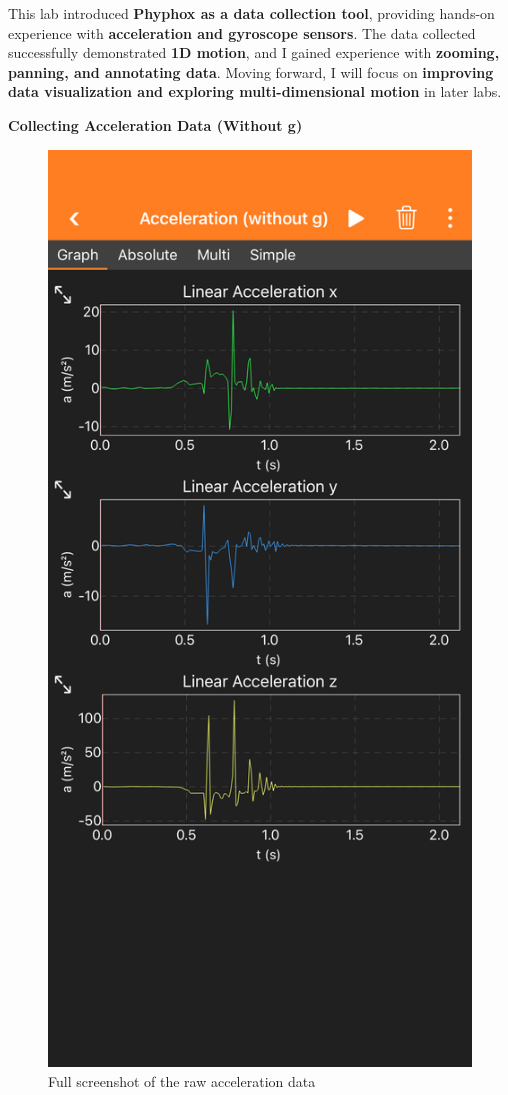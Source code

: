 \documentclass[idxtotoc,hyperref,openany]{labbook} %
\begin{document}
This lab introduced \textbf{Phyphox as a data collection tool}, providing hands-on experience with \textbf{acceleration and gyroscope sensors}. The data collected successfully demonstrated \textbf{1D motion}, and I gained experience with \textbf{zooming, panning, and annotating data}. Moving forward, I will focus on \textbf{improving data visualization and exploring multi-dimensional motion} in later labs.


\newpage
{}
\textbf{Collecting Acceleration Data (Without g)}
\begin{figure}[H] %
\begin{center}
\includegraphics[width=.55\linewidth]{images/Lab.02/PhoneDropFull1.PNG}
\end{center}
\caption{Full screenshot of the raw acceleration data}
\label{fig:Lab02-PhoneDropFull1}
\end{figure}
\end{document}

